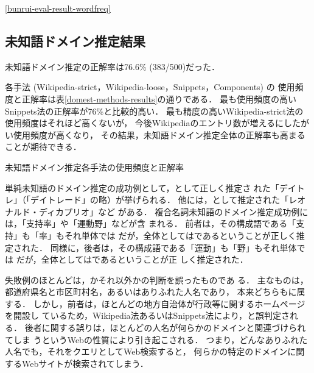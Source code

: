 \documentclass[japanese]{jnlp_1.4}
\newcommand{\revise}[1]{}
\newcommand{\dom}[1]{}
\begin{document}
\revise{
本研究ではドメインごとのIDF値の合計をブログ分類時のスコアとして使用した
が，より単純に，ドメインごとの語数を用いた場合は，表
}
\ref{bunrui-eval-result-wordfreq}
\revise{
のような結果になる．
}
\revise{
IDF値合計を用いた場合を若干下回っているが，これは単純に語数を用いるより，
IDF値で重み付けすることがより効果的であることを示している．
}


\subsection{未知語ドメイン推定結果}

未知語ドメイン推定の正解率は76.6\% (383/500)だった．

各手法 (Wikipedia-strict，Wikipedia-loose，Snippets，Components) の
使用頻度と正解率は表\ref{domest-methods-results}の通りである．
最も使用頻度の高いSnippets法の正解率が76\%と比較的高い．
最も精度の高いWikipedia-strict法の使用頻度はそれほど高くないが，
今後Wikipediaのエントリ数が増えるにしたがい使用頻度が高くなり，
その結果，未知語ドメイン推定全体の正解率も高まることが期待できる．


\begin{table}[t]
\caption{未知語ドメイン推定各手法の使用頻度と正解率}
\label{domest-methods-results}
\begin{center}

\end{center}
\end{table}


単純未知語のドメイン推定の成功例として，\dom{ビジネス}として正しく推定さ
れた「デイトレ」（「デイトレード」の略）が挙げられる．
他には，\dom{文化・芸術}として推定された「レオナルド・ディカプリオ」など
がある．
複合名詞未知語のドメイン推定成功例には，「支持率」や「運動野」などが含
まれる．
前者は，その構成語である「支持」も「率」もそれ単体では\dom{ドメイン無し}
だが，全体としては\dom{政治}であるということが正しく推定された．
同様に，後者は，その構成語である「運動」も「野」もそれ単体では
\dom{ドメイン無し}だが，全体としては\dom{健康・医学}であるということが正
しく推定された．

失敗例のほとんどは，\dom{ドメイン無し}かそれ以外かの判断を誤ったものであ
る．
主なものは，都道府県名と市区町村名，あるいはありふれた人名であり，
本来どちらも\dom{ドメイン無し}に属する．
しかし，前者は，ほとんどの地方自治体が行政等に関するホームページを開設し
ているため，Wikipedia法あるいはSnippets法により，\dom{政治}と誤判定され
る．
後者に関する誤りは，ほとんどの人名が何らかのドメインと関連づけられてしま
うというWebの性質により引き起こされる．
つまり，どんなありふれた人名でも，それをクエリとしてWeb検索すると，
何らかの特定のドメインに関するWebサイトが検索されてしまう．
\end{document}
